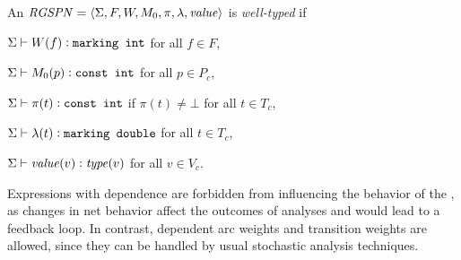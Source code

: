 \begin{dfn}
  An  \(\textrm{\itshape RGSPN\/} = \langle \Sigma, F, W, M_0, \pi, \lambda, \textrm{\itshape value\/} \rangle\) is \emph{well-typed} if
  \begin{compactitem}
  \item \(\Sigma \vdash W(f) \mathrel{\vcentcolon} \texttt{\upshape marking int}\) for all \(f \in F\),
  \item \(\Sigma \vdash M_0(p) \mathrel{\vcentcolon} \texttt{\upshape const int}\) for all \(p \in P_c\),
  \item \(\Sigma \vdash \pi(t) \mathrel{\vcentcolon} \texttt{\upshape const int}\) if \(\pi(t) \ne \bot\) for all \(t \in T_c\),
  \item \(\Sigma \vdash \lambda(t) \mathrel{\vcentcolon} \texttt{\upshape marking double}\) for all \(t \in T_c\),
  \item \(\Sigma \vdash \textrm{\itshape value\/}(v) \mathrel{\vcentcolon} \textrm{\itshape type\/}(v)\) for all \(v \in V_c\).
  \end{compactitem}
\end{dfn}

Expressions with  dependence are forbidden from influencing the behavior of the , as changes in net behavior affect the outcomes of analyses and would lead to a feedback loop. In contrast,  dependent arc weights and transition weights are allowed, since they can be handled by usual stochastic analysis techniques.


